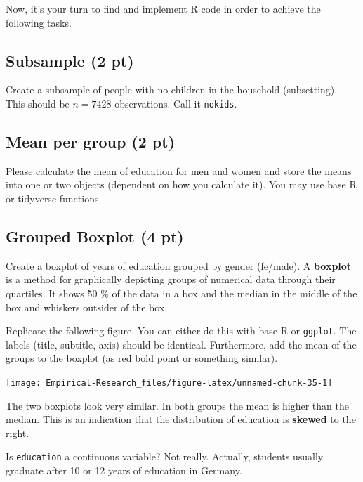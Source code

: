 \documentclass[
]{book}
\begin{document}
Now, it's your turn to find and implement R code in order to achieve the following tasks.

\hypertarget{subsample-2-pt}{%
\subsection{Subsample (2 pt)}\label{subsample-2-pt}}

Create a subsample of people with no children in the household (subsetting). This should be \(n=7428\) observations. Call it \texttt{nokids}.

\hypertarget{mean-per-group-2-pt}{%
\subsection{Mean per group (2 pt)}\label{mean-per-group-2-pt}}

Please calculate the mean of education for men and women and store the means into one or two objects (dependent on how you calculate it). You may use base R or tidyverse functions.

\hypertarget{grouped-boxplot-4-pt}{%
\subsection{Grouped Boxplot (4 pt)}\label{grouped-boxplot-4-pt}}

Create a boxplot of years of education grouped by gender (fe/male). A \textbf{boxplot} is a method for graphically depicting groups of numerical data through their quartiles. It shows 50 \% of the data in a box and the median in the middle of the box and whiskers outsider of the box.

Replicate the following figure. You can either do this with base R or \texttt{ggplot}. The labels (title, subtitle, axis) should be identical. Furthermore, add the mean of the groups to the boxplot (as red bold point or something similar).

\begin{center}\texttt{[image: Empirical-Research\_files/figure-latex/unnamed-chunk-35-1]} \end{center}

The two boxplots look very similar. In both groups the mean is higher than the median. This is an indication that the distribution of education is \textbf{skewed} to the right.

Is \texttt{education} a continuous variable? Not really. Actually, students usually graduate after 10 or 12 years of education in Germany.
\end{document}
